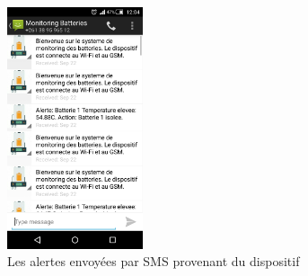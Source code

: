 \begin{figure}[H]
	\centering
	\includegraphics[width=4cm]{./img/composants/sms.png}
	\caption{Les alertes envoyées par SMS provenant du dispositif}
	\label{fig:relais_5vdc}
\end{figure}
